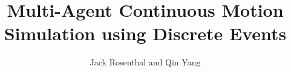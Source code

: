 \documentclass[aspectratio=1610,mathserif]{beamer}
\title{Multi-Agent Continuous Motion Simulation using Discrete Events}
\author{Jack Rosenthal and Qin Yang}
\institute{Robot Planning \& Manipulation}
\begin{document}
\maketitle

\begin{frame}

\end{frame}
\end{document}
